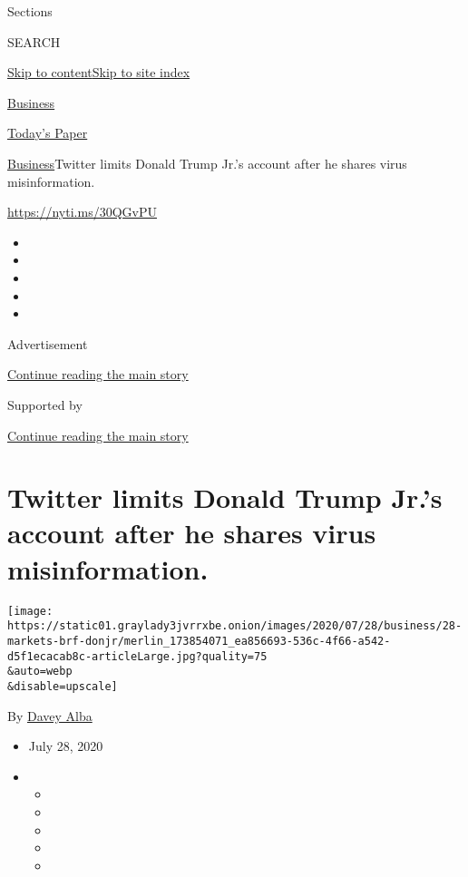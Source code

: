 Sections

SEARCH

\protect\hyperlink{site-content}{Skip to
content}\protect\hyperlink{site-index}{Skip to site index}

\href{https://www.nytimes3xbfgragh.onion/section/business}{Business}

\href{https://myaccount.nytimes3xbfgragh.onion/auth/login?response_type=cookie\&client_id=vi}{}

\href{https://www.nytimes3xbfgragh.onion/section/todayspaper}{Today's
Paper}

\href{/section/business}{Business}\textbar{}Twitter limits Donald Trump
Jr.'s account after he shares virus misinformation.

\url{https://nyti.ms/30QGvPU}

\begin{itemize}
\item
\item
\item
\item
\item
\end{itemize}

Advertisement

\protect\hyperlink{after-top}{Continue reading the main story}

Supported by

\protect\hyperlink{after-sponsor}{Continue reading the main story}

\hypertarget{twitter-limits-donald-trump-jrs-account-after-he-shares-virus-misinformation}{%
\section{Twitter limits Donald Trump Jr.'s account after he shares virus
misinformation.}\label{twitter-limits-donald-trump-jrs-account-after-he-shares-virus-misinformation}}

\texttt{[image: https://static01.graylady3jvrrxbe.onion/images/2020/07/28/business/28-markets-brf-donjr/merlin\_173854071\_ea856693-536c-4f66-a542-d5f1ecacab8c-articleLarge.jpg?quality=75\\\&auto=webp\\\&disable=upscale]}

By \href{https://www.nytimes3xbfgragh.onion/by/davey-alba}{Davey Alba}

\begin{itemize}
\item
  July 28, 2020
\item
  \begin{itemize}
  \item
  \item
  \item
  \item
  \item
  \end{itemize}
\end{itemize}

